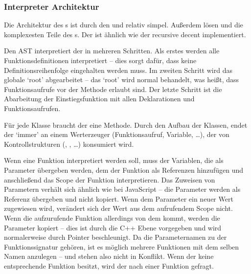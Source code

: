     \subsubsection{Interpreter Architektur}
    \label{sssec:Interpreter Architektur}
      Die Architektur des s ist durch den  und  relativ simpel. Außerdem lösen  und  die komplexesten Teile des s. Der  ist ähnlich wie der  recursive decent implementiert.

      Den AST interpretiert der  in mehreren Schritten. Als erstes werden alle Funktionsdefinitionen interpretiert -- dies sorgt dafür, dass keine Definitionsreihenfolge eingehalten werden muss. Im zweiten Schritt wird das globale `root'  abgearbeitet -- das `root'  wird normal behandelt, was heißt, dass Funktionsaufrufe vor der  Methode erlaubt sind. Der letzte Schritt ist die Abarbeitung der Einstiegsfunktion  mit allen Deklarationen und Funktionsaufrufen.

      Für jede  Klasse braucht der  eine  Methode. Durch den Aufbau der  Klassen, endet der  `immer' an einem Werterzeuger (Funktionsaufruf, Variable, \ldots), der von Kontrollstrukturen (, , \ldots) konsumiert wird.

      Wenn eine Funktion interpretiert werden soll, muss der  Variablen, die als Parameter übergeben werden, dem  der Funktion als Referenzen hinzufügen und anschließend das Scope der Funktion interpretieren. %
      Das Zuweisen von Parametern verhält sich ähnlich wie bei JavaScript -- die Parameter werden als Referenz übergeben und nicht kopiert.
      Wenn dem Parameter ein neuer Wert zugewiesen wird, verändert sich der Wert aus dem aufrufendem Scope nicht. %
      Wenn die aufzurufende Funktion allerdings von dem  kommt, werden die Parameter kopiert -- dies ist durch die C++ Ebene vorgegeben und wird normalerweise durch Pointer beschleunigt. Da die Parameternamen zu der Funktionssignatur gehören, ist es möglich mehrere Funktionen mit dem selben Namen anzulegen --  und  stehen also nicht in Konflikt. Wenn der  keine entsprechende Funktion besitzt, wird der  nach einer Funktion gefragt.


